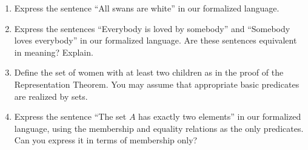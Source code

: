 \Exercises

\begin{enumerate}

\item  Express the sentence ``All swans are white'' in our formalized language.

\item  Express the sentences ``Everybody is loved by somebody'' and ``Somebody
  loves everybody'' in our formalized language.  Are these sentences equivalent
  in meaning?  Explain.

\item  Define the set of women with at least two children as in the proof of
  the Representation Theorem.  You may assume that appropriate basic predicates
  are realized by sets.

\item  Express the sentence ``The set $A$ has exactly two elements'' in our
  formalized language, using the membership and equality
  relations as the only predicates.  Can you express it in terms of membership
  only?

\end{enumerate}

